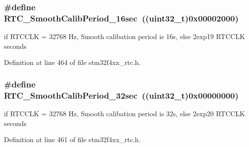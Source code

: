 \hypertarget{group___r_t_c___smooth__calib__period___definitions_ga31b86cd48a0ef55f1837ab5175c52eb9}{
\subsubsection[{R\-T\-C\-\_\-\-Smooth\-Calib\-Period\-\_\-16sec}]{\setlength{\rightskip}{0pt plus 5cm}\#define R\-T\-C\-\_\-\-Smooth\-Calib\-Period\-\_\-16sec~((uint32\-\_\-t)0x00002000)}}\label{group___r_t_c___smooth__calib__period___definitions_ga31b86cd48a0ef55f1837ab5175c52eb9}
if R\-T\-C\-C\-L\-K = 32768 Hz, Smooth calibation period is 16s, else 2exp19 R\-T\-C\-C\-L\-K seconds 

Definition at line 464 of file stm32f4xx\-\_\-rtc.\-h.

\hypertarget{group___r_t_c___smooth__calib__period___definitions_ga1410c28a3644ce52dfbdf2f21a037eef}{
\subsubsection[{R\-T\-C\-\_\-\-Smooth\-Calib\-Period\-\_\-32sec}]{\setlength{\rightskip}{0pt plus 5cm}\#define R\-T\-C\-\_\-\-Smooth\-Calib\-Period\-\_\-32sec~((uint32\-\_\-t)0x00000000)}}\label{group___r_t_c___smooth__calib__period___definitions_ga1410c28a3644ce52dfbdf2f21a037eef}
if R\-T\-C\-C\-L\-K = 32768 Hz, Smooth calibation period is 32s, else 2exp20 R\-T\-C\-C\-L\-K seconds 

Definition at line 461 of file stm32f4xx\-\_\-rtc.\-h.

